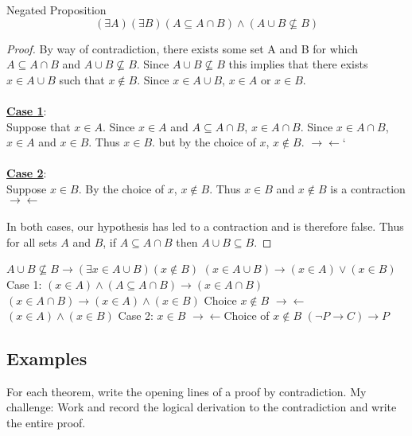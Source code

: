 \documentclass[12pt]{article}
\newcommand{\defline}[2]{\noindent\textbf{\underline{#1}}: #2\\}
\newcommand{\contradiction}{$\rightarrow\leftarrow$}
\begin{document}
            Negated Proposition
            \begin{equation}
                (\exists A)(\exists B)(A\subseteq A\cap B)\wedge (A\cup B \not\subseteq B)
            \end{equation}
            \begin{proof}
                By way of contradiction, there exists some set A and B for which $A\subseteq A\cap B$ and $A\cup B \not\subseteq B$.
                Since $A\cup B \not\subseteq B$ this implies that there exists $x\in A\cup B$ such that $x\notin B$.
                Since $x\in A\cup B$, $x\in A$ or $x\in B$.
                \\\\
                \defline{Case 1}{}
                Suppose that $x\in A$.
                Since $x\in A$ and $A\subseteq A\cap B$, $x\in A\cap B$.
                Since $x\in A\cap B$, $x\in A$ and $x\in B$.
                Thus $x\in B$. but by the choice of $x$, $x\notin B$. \contradiction`
                \\\\
                \defline{Case 2}{}
                Suppose $x\in B$.
                By the choice of $x$, $x\notin B$.
                Thus $x\in B$ and $x\notin B$ is a contraction \contradiction
                \\\\
                In both cases, our hypothesis has led to a contraction and is therefore false.
                Thus for all sets $A$ and $B$, if $A\subseteq A\cap B$ then $A\cup B\subseteq B$.
            \end{proof}

            \begin{outline}
                \1 $A \cup B\not\subseteq B\rightarrow (\exists x\in A\cup B )(x\notin B)$
                \1 $(x\in A\cup B)\rightarrow (x\in A)\vee (x\in B)$
                \1 Case 1:
                    \2 $(x\in A)\wedge (A\subseteq A\cap B) \rightarrow (x\in A\cap B)$
                    \2 $(x\in A\cap B)\rightarrow(x\in A)\wedge (x\in B)$
                    \2 Choice $x\notin B$ \contradiction $(x\in A)\wedge (x\in B)$
                \1 Case 2:
                    \2 $x\in B$ \contradiction Choice of $x\notin B$
                \1 $(\neg P \rightarrow C) \rightarrow P$
            \end{outline}

            \subsection{Examples}
                For each theorem, write the opening lines of a proof by contradiction.
                My challenge: Work and record the logical derivation to the contradiction and write the entire proof.
\end{document}
